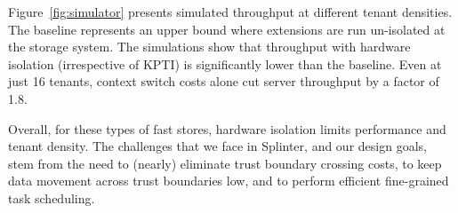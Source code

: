 Figure~\ref{fig:simulator} presents simulated throughput at different
tenant densities. The baseline represents an upper bound where
extensions are run un-isolated at the storage system. The simulations
show that throughput with hardware isolation (irrespective of KPTI) is
significantly lower than the baseline. Even at just 16 tenants, context
switch costs alone cut server throughput by a factor of 1.8.

Overall, for these types of fast stores, hardware isolation limits performance
  and tenant density.
The challenges that we face in Splinter, and our design goals, stem from
    the need to (nearly)
  eliminate trust boundary crossing costs, to keep data movement across trust
  boundaries low, and to perform efficient fine-grained task scheduling.

